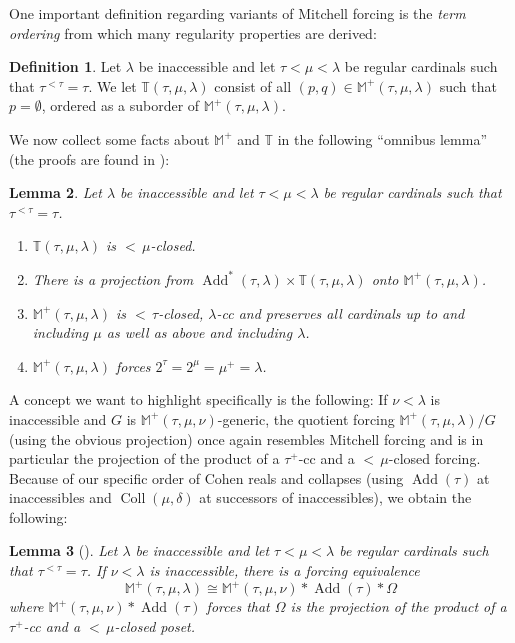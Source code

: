 \documentclass[12pt]{amsart}
\theoremstyle{definition}
\newtheorem{mydef}{Definition}[section]
\theoremstyle{remark}
\theoremstyle{plain}
\newtheorem{mylem}[mydef]{Lemma}
\numberwithin{mydef}{section}
\DeclareMathOperator{\Add}{Add}
\DeclareMathOperator{\Coll}{Coll}
\newcommand{\dM}{\mathbb{M}}
\newcommand{\dT}{\mathbb{T}}
\begin{document}
	One important definition regarding variants of Mitchell forcing is the \emph{term ordering} from which many regularity properties are derived:
	
	\begin{mydef}
		Let $\lambda$ be inaccessible and let $\tau<\mu<\lambda$ be regular cardinals such that $\tau^{<\tau}=\tau$. We let $\dT(\tau,\mu,\lambda)$ consist of all $(p,q)\in\dM^+(\tau,\mu,\lambda)$ such that $p=\emptyset$, ordered as a suborder of $\dM^+(\tau,\mu,\lambda)$.
	\end{mydef}
	
	We now collect some facts about $\dM^+$ and $\dT$ in the following ``omnibus lemma'' (the proofs are found in \cite[Section 1.3]{LevineDisjointStatSeq}):
	
	\begin{mylem}\label{OmnibusLemma}
		Let $\lambda$ be inaccessible and let $\tau<\mu<\lambda$ be regular cardinals such that $\tau^{<\tau}=\tau$.
		\begin{enumerate}
			\item $\dT(\tau,\mu,\lambda)$ is ${<}\,\mu$-closed.
			\item There is a projection from $\Add^*(\tau,\lambda)\times\dT(\tau,\mu,\lambda)$ onto $\dM^+(\tau,\mu,\lambda)$.
			\item $\dM^+(\tau,\mu,\lambda)$ is ${<}\,\tau$-closed, $\lambda$-cc and preserves all cardinals up to and including $\mu$ as well as above and including $\lambda$.
			\item $\dM^+(\tau,\mu,\lambda)$ forces $2^{\tau}=2^{\mu}=\mu^+=\lambda$.
		\end{enumerate}
	\end{mylem}
	
	A concept we want to highlight specifically is the following: If $\nu<\lambda$ is inaccessible and $G$ is $\dM^+(\tau,\mu,\nu)$-generic, the quotient forcing $\dM^+(\tau,\mu,\lambda)/G$ (using the obvious projection) once again resembles Mitchell forcing and is in particular the projection of the product of a $\tau^+$-cc and a ${<}\,\mu$-closed forcing. Because of our specific order of Cohen reals and collapses (using $\Add(\tau)$ at inaccessibles and $\Coll(\mu,\delta)$ at successors of inaccessibles), we obtain the following:
	
	\begin{mylem}[{\cite[Lemma 22]{LevineDisjointStatSeq}}]\label{Decomp}
		Let $\lambda$ be inaccessible and let $\tau<\mu<\lambda$ be regular cardinals such that $\tau^{<\tau}=\tau$. If $\nu<\lambda$ is inaccessible, there is a forcing equivalence
		$$\dM^+(\tau,\mu,\lambda)\cong\dM^+(\tau,\mu,\nu)*\Add(\tau)*\Omega$$
		where $\dM^+(\tau,\mu,\nu)*\Add(\tau)$ forces that $\Omega$ is the projection of the product of a $\tau^+$-cc and a ${<}\,\mu$-closed poset.
	\end{mylem}
	
\end{document}
